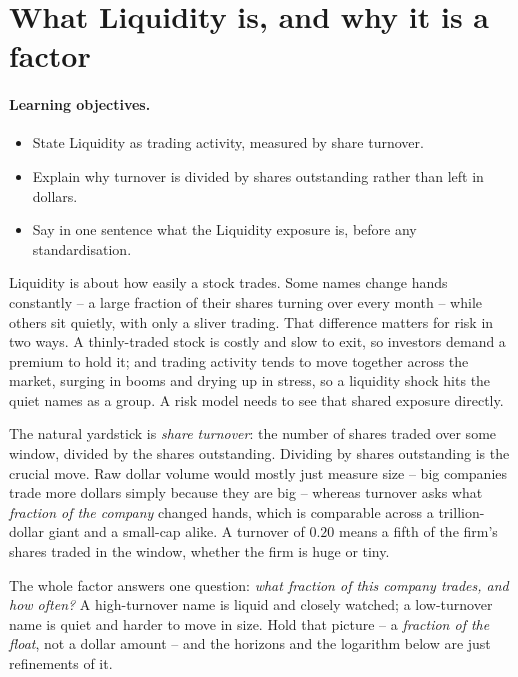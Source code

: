 \documentclass[11pt]{article}
\theoremstyle{definition}
\theoremstyle{plain}
\theoremstyle{remark}
\begin{document}
\tableofcontents
\bigskip

\section{What Liquidity is, and why it is a factor}\label{sec:what}

\paragraph{Learning objectives.}
\begin{itemize}[leftmargin=1.4em,topsep=2pt]
  \item State Liquidity as trading activity, measured by share turnover.
  \item Explain why turnover is divided by shares outstanding rather than left in dollars.
  \item Say in one sentence what the Liquidity exposure is, before any standardisation.
\end{itemize}

Liquidity is about how easily a stock trades. Some names change hands constantly -- a large fraction of their shares turning over every month -- while others sit quietly, with only a sliver trading. That difference matters for risk in two ways. A thinly-traded stock is costly and slow to exit, so investors demand a premium to hold it; and trading activity tends to move together across the market, surging in booms and drying up in stress, so a liquidity shock hits the quiet names as a group. A risk model needs to see that shared exposure directly.

The natural yardstick is \emph{share turnover}: the number of shares traded over some window, divided by the shares outstanding. Dividing by shares outstanding is the crucial move. Raw dollar volume would mostly just measure size -- big companies trade more dollars simply because they are big -- whereas turnover asks what \emph{fraction of the company} changed hands, which is comparable across a trillion-dollar giant and a small-cap alike. A turnover of $0.20$ means a fifth of the firm's shares traded in the window, whether the firm is huge or tiny.

\begin{intuition}
The whole factor answers one question: \emph{what fraction of this company trades, and how often?} A high-turnover name is liquid and closely watched; a low-turnover name is quiet and harder to move in size. Hold that picture -- a \emph{fraction of the float}, not a dollar amount -- and the horizons and the logarithm below are just refinements of it.
\end{intuition}
\end{document}
